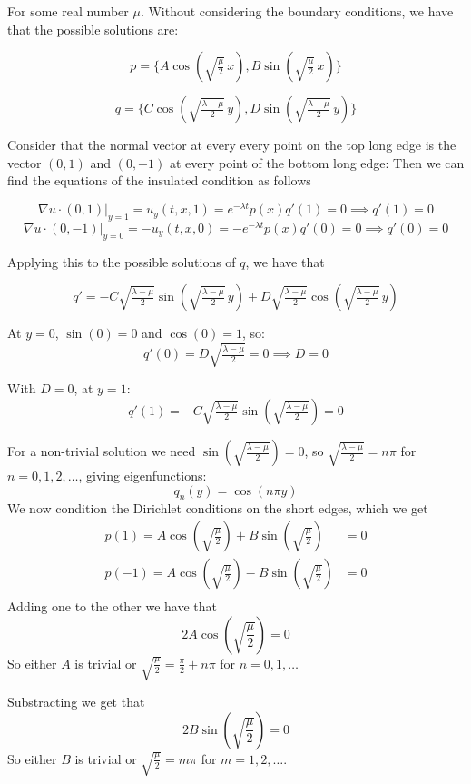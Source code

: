 \documentclass{article} %
\begin{document}
For some real number $\mu$. Without considering the boundary
conditions, we have that the possible solutions are:

\[
  p = \{A\cos\!\left(\sqrt{\tfrac{\mu}{2}}\,x\right),
  B\sin\!\left(\sqrt{\tfrac{\mu}{2}}\,x\right)\}
\]

\[
  q = \{C\cos\!\left(\sqrt{\tfrac{\lambda-\mu}{2}}\,y\right) ,
  D\sin\!\left(\sqrt{\tfrac{\lambda-\mu}{2}}\,y\right)\}
\]

Consider that the normal vector at every every point on the top long
edge is the vector $(0,1)$ and $(0,-1)$ at every point of the bottom
long edge: Then we can find the equations of the
insulated condition as follows

\[
  \nabla u \cdot (0,1)\big|_{y=1} = u_y(t,x,1) = e^{-\lambda
  t}p(x)q'(1) = 0 \implies q'(1) = 0
\]
\[
  \nabla u \cdot (0,-1)\big|_{y=0} = -u_y(t,x,0) = -e^{-\lambda
  t}p(x)q'(0) = 0 \implies q'(0) = 0
\]

Applying this to the possible solutions of $q$, we have that

\[
  q' =
  -C\sqrt{\tfrac{\lambda-\mu}{2}}\sin\!\left(\sqrt{\tfrac{\lambda-\mu}{2}}\,y\right)
  +
  D\sqrt{\tfrac{\lambda-\mu}{2}}\cos\!\left(\sqrt{\tfrac{\lambda-\mu}{2}}\,y\right)
\]

At $y=0$, $\sin(0)=0$ and $\cos(0)=1$, so:
\[
  q'(0) = D\sqrt{\tfrac{\lambda-\mu}{2}} = 0 \implies D = 0
\]

With $D=0$, at $y=1$:
\[
  q'(1) =
  -C\sqrt{\tfrac{\lambda-\mu}{2}}\sin\!\left(\sqrt{\tfrac{\lambda-\mu}{2}}\right)
  = 0
\]

For a non-trivial solution we need
$\sin\!\left(\sqrt{\tfrac{\lambda-\mu}{2}}\right) = 0$, so
$\sqrt{\tfrac{\lambda-\mu}{2}} = n\pi$ for $n = 0, 1, 2, \ldots$,
giving eigenfunctions:
\[
  q_n(y) = \cos(n\pi y)
\]
We now condition the Dirichlet conditions on the short edges, which we get
\begin{align*}
  p(1) = A\cos\!\left(\sqrt{\frac{\mu}{2}}\right) +
  B\sin\!\left(\sqrt{\frac{\mu}{2}}\right) &=0 \\
  p(-1) = A\cos\!\left(\sqrt{\frac{\mu}{2}}\right)
  -B\sin\!\left(\sqrt{\frac{\mu}{2}}\right) &=0 \\
\end{align*}
Adding one to the other we have that
\[
  2A\cos\!\left(\sqrt{\frac{\mu}{2}}\right) = 0
\]
So either $A$ is trivial or $\sqrt{\frac{\mu}{2}} = \frac{\pi}{2} + n\pi$
for $n = 0,1,\hdots$

Substracting we get that
\[
  2B\sin\!\left(\sqrt{\frac{\mu}{2}}\right) =0
\]
So either $B$ is trivial or $\sqrt{\frac{\mu}{2}} = m\pi$ for $m =
1,2,\hdots$.
\end{document}
